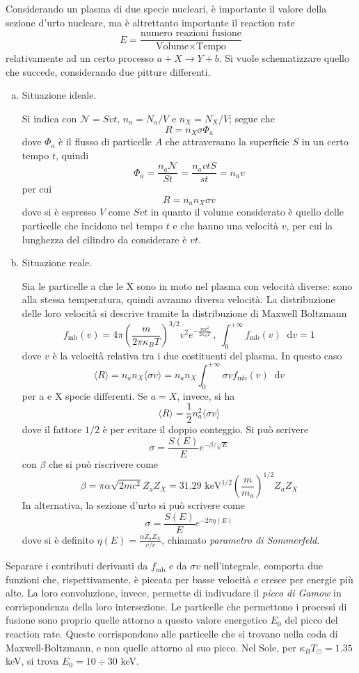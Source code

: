 \documentclass[11pt, a4paper]{scrartcl}
\theoremstyle{style}
\newcommand{\dd}{\mathop{}\!\mathrm{d}}
\numberwithin{equation}{subsection}
\begin{document}
Considerando un plasma di due specie nucleari, \`e importante il valore della sezione d'urto nucleare, ma \`e altrettanto importante il reaction rate 
\begin{equation}
	E = \frac{\text{numero reazioni fusione}}{\text{Volume}\times \text{Tempo}}
\end{equation}
relativamente ad un certo processo $a + X \to  Y+b$.
Si vuole schematizzare quello che succede, considerando due pitture differenti.
\begin{enumerate}[(a).]
	\item Situazione ideale.

		Si indica con $\mathcal{N} = S vt$, $n_a = N_a / V$ e $n_X = N_X / V$; segue che 
		\[
		R = n_X \sigma \Phi _a
		\] 
	dove $\Phi _a$ \`e il flusso di particelle $A$ che attraversano la superficie $S$ in un certo tempo $t$, quindi
	\[
	\Phi _a = \frac{n_a \mathcal{N} }{St} = \frac{n_a vtS}{st} = n_a v
	\] 
per cui
\[
R = n_a n_X \sigma v
\] 
dove si \`e espresso $V$ come $S vt$ in quanto il volume considerato \`e quello delle particelle che incidono nel tempo $t$ e che hanno una velocit\`a $v$, per cui la lunghezza del cilindro da considerare \`e $vt$.

\item Situazione reale.

	Sia le particelle a che le X sono in moto nel plasma con velocit\`a diverse: sono alla stessa temperatura, quindi avranno diversa velocit\`a.
	La distribuzione delle loro velocit\`a si descrive tramite la distribuzione di Maxwell Boltzmann
	\[
	f_\text{mb} (v) = 4\pi \left(\frac{m}{2\pi \kappa _B T }\right) ^{3 / 2} v^2 e^{ - \frac{mv^2}{2\kappa _B T}} \, , \ \int _0^{+\infty} f_\text{mb}(v) \dd v = 1
	\] 
	dove $v$ \`e la velocit\`a relativa tra i due costituenti del plasma.
	In questo caso
	\[
	\langle R \rangle = n_a n_X \langle \sigma v \rangle= n_a n_X \int _0^{+\infty} \sigma v f_\text{mb} (v) \dd v
	\] 
	per a e X specie differenti.
	Se $a = X$, invece, si ha 
	\[
	\langle R \rangle = \frac{1}{2} n_a ^2 \langle \sigma v \rangle
	\] 
	dove il fattore $1 / 2$ \`e per evitare il doppio conteggio.
	Si pu\`o scrivere 
	\[
		\sigma = \frac{S(E)}{E} e^{- \beta  / \sqrt{E}}
	\] 
	con $\beta $ che si pu\`o riscrivere come
	\[
	\beta = \pi \alpha  \sqrt{2 m c^2 }  Z_a Z_X = 31.29 \text{ keV}^{1/2} \left(\frac{m}{m_a}\right) ^{1 / 2} Z_a Z_X
	\] 
	In alternativa, la sezione d'urto si pu\`o scrivere come
	\[
	\sigma = \frac{S(E)}{E} e^{- 2 \pi \eta (E)}
	\] 
	dove si \`e definito $\eta (E) = \frac{\alpha  Z_a Z_X}{v / c}$, chiamato \textit{parametro di Sommerfeld}.
\end{enumerate}
Separare i contributi derivanti da $f_\text{mb}$ e da $\sigma v$ nell'integrale, comporta due funzioni che, rispettivamente, \`e piccata per basse velocit\`a e cresce per energie pi\`u alte.
La loro convoluzione, invece, permette di indivudare il \textit{picco di Gamow} in corrispondenza della loro intersezione.
Le particelle che permettono i processi di fusione sono proprio quelle attorno a questo valore energetico $E_0$ del picco del reaction rate.
Queste corrispondono alle particelle che si trovano nella coda di Maxwell-Boltzmann, e non quelle attorno al suo picco.
Nel Sole, per $\kappa _B T_\odot  = 1.35$ keV, si trova $E_0 = 10 \div 30$ keV.
\end{document}
